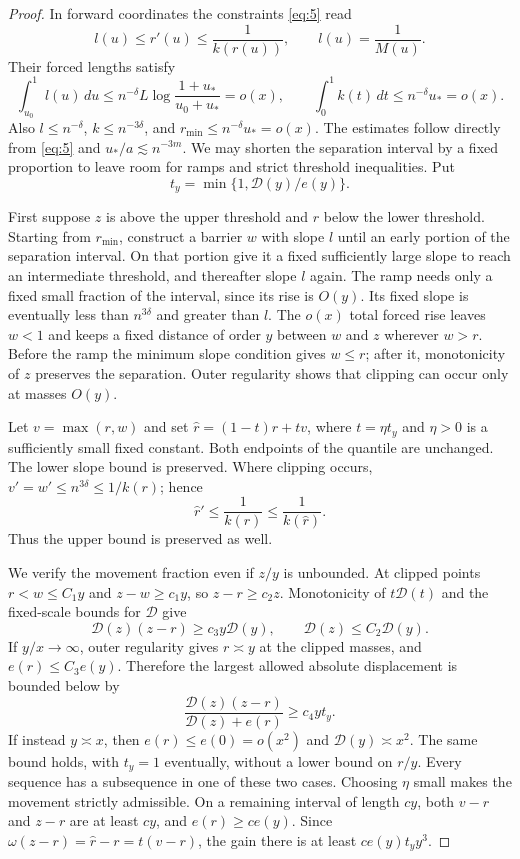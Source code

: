 \begin{proof}
In forward coordinates the constraints \eqref{eq:5} read
\[
 l(u)\le r'(u)\le\frac1{k(r(u))},\qquad l(u)=\frac1{M(u)}.
\]
Their forced lengths satisfy
\[
 \int_{u_0}^1l(u)\,du
    \le n^{-\delta}L\log\frac{1+u_*}{u_0+u_*}=o(x),
 \qquad
 \int_0^1 k(t)\,dt\le n^{-\delta}u_*=o(x).
\]
Also $l\le n^{-\delta}$, $k\le n^{-3\delta}$, and
$r_{\min}\le n^{-\delta}u_*=o(x)$.  The estimates follow directly
from \eqref{eq:5} and $u_*/a\lesssim n^{-3m}$.
We may shorten the separation interval by a fixed proportion to
leave room for ramps and strict threshold inequalities.  Put
\[
 t_y=\min\{1,\mathcal D(y)/e(y)\}.
\]

First suppose $z$ is above the upper threshold and $r$ below the
lower threshold.  Starting from $r_{\min}$, construct a barrier
$w$ with slope $l$ until an early portion of the separation
interval.  On that portion give it a fixed sufficiently large
slope to reach an intermediate threshold, and thereafter slope
$l$ again.  The ramp needs only a fixed small fraction of the
interval, since its rise is $O(y)$.  Its fixed slope is eventually
less than $n^{3\delta}$ and greater than $l$.  The $o(x)$ total
forced rise leaves $w<1$ and keeps a fixed distance of order $y$
between $w$ and $z$ wherever $w>r$.  Before the ramp the minimum
slope condition gives $w\le r$; after it, monotonicity of $z$
preserves the separation.  Outer regularity shows that clipping
can occur only at masses $O(y)$.

Let $v=\max(r,w)$ and set
$\widehat r=(1-t)r+tv$, where $t=\eta t_y$ and $\eta>0$ is a
sufficiently small fixed constant.  Both endpoints of the quantile
are unchanged.  The lower slope bound is preserved.  Where clipping
occurs, $v'=w'\le n^{3\delta}\le1/k(r)$; hence
\[
 \widehat r'\le\frac1{k(r)}\le\frac1{k(\widehat r)}.
\]
Thus the upper bound is preserved as well.

We verify the movement fraction even if $z/y$ is unbounded.
At clipped points $r<w\le C_1y$ and $z-w\ge c_1y$, so
$z-r\ge c_2z$.  Monotonicity of $t\mathcal D(t)$ and the
fixed-scale bounds for $\mathcal D$ give
\[
 \mathcal D(z)(z-r)\ge c_3y\mathcal D(y),
 \qquad \mathcal D(z)\le C_2\mathcal D(y).
\]
If $y/x\to\infty$, outer regularity gives $r\asymp y$ at the
clipped masses, and $e(r)\le C_3e(y)$.  Therefore the largest
allowed absolute displacement is bounded below by
\[
 \frac{\mathcal D(z)(z-r)}{\mathcal D(z)+e(r)}
       \ge c_4yt_y.
\]
If instead $y\asymp x$, then
$e(r)\le e(0)=o(x^2)$ and $\mathcal D(y)\asymp x^2$.
The same bound holds, with $t_y=1$ eventually, without a lower
bound on $r/y$.  Every sequence has a subsequence in one of
these two cases.  Choosing $\eta$ small makes the movement
strictly admissible.  On a remaining interval of length $cy$,
both $v-r$ and $z-r$ are at least $cy$, and $e(r)\ge ce(y)$.
Since $\omega(z-r)=\widehat r-r=t(v-r)$, the gain there is at
least $c e(y)t_y y^3$.


\end{proof}
